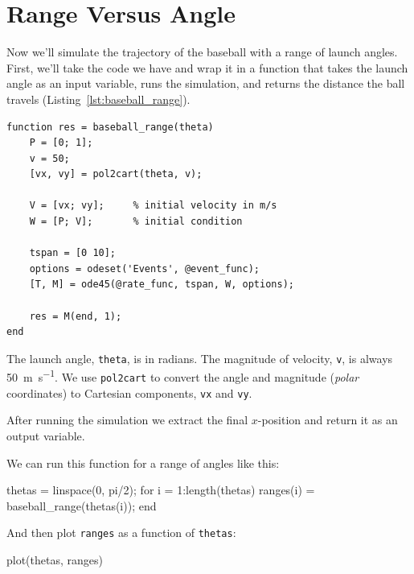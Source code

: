 

\section{Range Versus Angle}

Now we'll simulate the trajectory of the baseball with a range of launch angles.  First, we'll take the code we have and wrap it in a function that takes the launch angle as an input variable, runs the simulation, and returns the distance the ball travels (Listing~\ref{lst:baseball_range}).


\begin{lstlisting}[caption={A function that takes the launch angle of a baseball and returns the distance it travels}, label={lst:baseball_range}]
function res = baseball_range(theta)
    P = [0; 1];
    v = 50;
    [vx, vy] = pol2cart(theta, v);

    V = [vx; vy];     % initial velocity in m/s
    W = [P; V];       % initial condition

    tspan = [0 10];
    options = odeset('Events', @event_func);
    [T, M] = ode45(@rate_func, tspan, W, options);

    res = M(end, 1);
end
\end{lstlisting}

The launch angle, \lstinline{theta}, is in radians.  The magnitude of velocity, \lstinline{v}, is always \SI{50}{\meter\per\second}.  We use \lstinline{pol2cart} to convert the angle and magnitude (\emph{polar} coordinates) to Cartesian components, \lstinline{vx} and \lstinline{vy}.


After running the simulation we extract the final $x$-position and return it as an output variable.

We can run this function for a range of angles like this:

\begin{code}
    thetas = linspace(0, pi/2);
    for i = 1:length(thetas)
        ranges(i) = baseball_range(thetas(i));
    end
\end{code}
And then plot \lstinline{ranges} as a function of \lstinline{thetas}:

\begin{code}
    plot(thetas, ranges)
\end{code}

